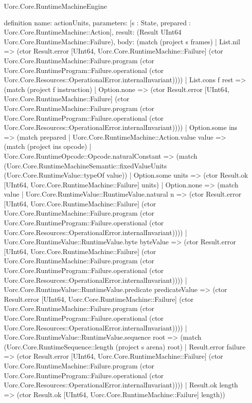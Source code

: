 \begin{lexlean}{Uorc.Core.RuntimeMachineEngine}
\begin{semanticmodule}
definition{
  name: actionUnits,
  parameters: [s : State, prepared : Uorc.Core.RuntimeMachine::Action],
  result: (Result UInt64 Uorc.Core.RuntimeMachine::Failure),
  body: (match (project s frames)
    | List.nil => (ctor Result.error [UInt64, Uorc.Core.RuntimeMachine::Failure] (ctor Uorc.Core.RuntimeMachine::Failure.program (ctor Uorc.Core.RuntimeProgram::Failure.operational (ctor Uorc.Core.Resources::OperationalError.internalInvariant))))
    | List.cons f rest => (match (project f instruction)
      | Option.none => (ctor Result.error [UInt64, Uorc.Core.RuntimeMachine::Failure] (ctor Uorc.Core.RuntimeMachine::Failure.program (ctor Uorc.Core.RuntimeProgram::Failure.operational (ctor Uorc.Core.Resources::OperationalError.internalInvariant))))
      | Option.some ins => (match prepared
        | Uorc.Core.RuntimeMachine::Action.value value => (match (project ins opcode)
          | Uorc.Core.RuntimeOpcode::Opcode.naturalConstant => (match (Uorc.Core.RuntimeMachineSemantic::fixedValueUnits (Uorc.Core.RuntimeValue::typeOf value))
            | Option.some units => (ctor Result.ok [UInt64, Uorc.Core.RuntimeMachine::Failure] units)
            | Option.none => (match value
              | Uorc.Core.RuntimeValue::RuntimeValue.natural n => (ctor Result.error [UInt64, Uorc.Core.RuntimeMachine::Failure] (ctor Uorc.Core.RuntimeMachine::Failure.program (ctor Uorc.Core.RuntimeProgram::Failure.operational (ctor Uorc.Core.Resources::OperationalError.internalInvariant))))
              | Uorc.Core.RuntimeValue::RuntimeValue.byte byteValue => (ctor Result.error [UInt64, Uorc.Core.RuntimeMachine::Failure] (ctor Uorc.Core.RuntimeMachine::Failure.program (ctor Uorc.Core.RuntimeProgram::Failure.operational (ctor Uorc.Core.Resources::OperationalError.internalInvariant))))
              | Uorc.Core.RuntimeValue::RuntimeValue.predicate predicateValue => (ctor Result.error [UInt64, Uorc.Core.RuntimeMachine::Failure] (ctor Uorc.Core.RuntimeMachine::Failure.program (ctor Uorc.Core.RuntimeProgram::Failure.operational (ctor Uorc.Core.Resources::OperationalError.internalInvariant))))
              | Uorc.Core.RuntimeValue::RuntimeValue.sequence root => (match (Uorc.Core.RuntimeSequence::length (project s arena) root)
                | Result.error failure => (ctor Result.error [UInt64, Uorc.Core.RuntimeMachine::Failure] (ctor Uorc.Core.RuntimeMachine::Failure.program (ctor Uorc.Core.RuntimeProgram::Failure.operational (ctor Uorc.Core.Resources::OperationalError.internalInvariant))))
                | Result.ok length => (ctor Result.ok [UInt64, Uorc.Core.RuntimeMachine::Failure] length))
}
\end{semanticmodule}
\end{lexlean}
